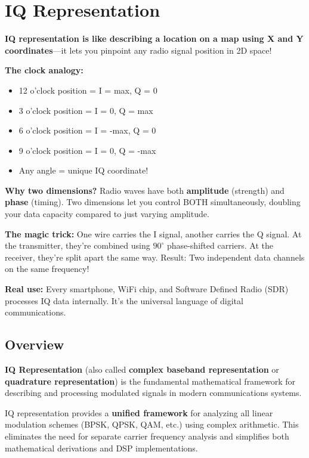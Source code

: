 \chapter{IQ Representation}
\label{ch:iq-representation}

\begin{nontechnical}
\textbf{IQ representation is like describing a location on a map using X and Y coordinates}---it lets you pinpoint any radio signal position in 2D space!

\textbf{The clock analogy:}
\begin{itemize}
\item 12 o'clock position = I = max, Q = 0
\item 3 o'clock position = I = 0, Q = max
\item 6 o'clock position = I = -max, Q = 0
\item 9 o'clock position = I = 0, Q = -max
\item Any angle = unique IQ coordinate!
\end{itemize}

\textbf{Why two dimensions?} Radio waves have both \textbf{amplitude} (strength) and \textbf{phase} (timing). Two dimensions let you control BOTH simultaneously, doubling your data capacity compared to just varying amplitude.

\textbf{The magic trick:} One wire carries the I signal, another carries the Q signal. At the transmitter, they're combined using $90^\circ$ phase-shifted carriers. At the receiver, they're split apart the same way. Result: Two independent data channels on the same frequency!

\textbf{Real use:} Every smartphone, WiFi chip, and Software Defined Radio (SDR) processes IQ data internally. It's the universal language of digital communications.
\end{nontechnical}

\section{Overview}

\textbf{IQ Representation} (also called \textbf{complex baseband representation} or \textbf{quadrature representation}) is the fundamental mathematical framework for describing and processing modulated signals in modern communications systems.

\begin{keyconcept}
IQ representation provides a \textbf{unified framework} for analyzing all linear modulation schemes (BPSK, QPSK, QAM, etc.) using complex arithmetic. This eliminates the need for separate carrier frequency analysis and simplifies both mathematical derivations and DSP implementations.
\end{keyconcept}

